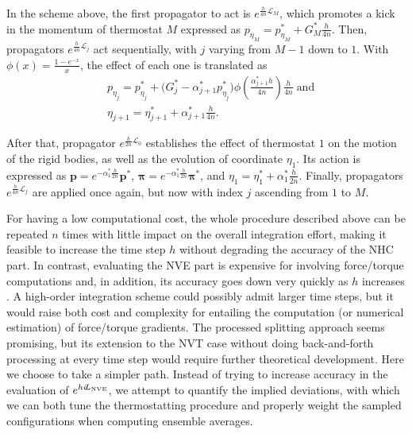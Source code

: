 \documentclass[
journal=jctcce,
layout=twocolumn
]{achemso}
\newcommand{\vt}[1]{\boldsymbol{\mathbf{#1}}}   %
\newcommand{\Liu}[1]{i\!L_\text{#1}}            %
\newcommand{\timestep}{h}
\begin{document}
In the scheme above, the first propagator to act is $e^{\frac{\timestep}{4n} \mathcal{L}_M}$, which promotes a kick in the momentum of thermostat $M$ expressed as $p_{\eta_M} = p_{\eta_M}^\ast + G_M^\ast \frac{\timestep}{4n}$.
Then, propagators $e^{\frac{\timestep}{4n} \mathcal{L}_j}$ act sequentially, with $j$ varying from $M-1$ down to $1$.
With $\phi(x) = \frac{1-e^{-x}}{x}$, the effect of each one is translated as
\begin{align*}
&p_{\eta_j} = p_{\eta_j}^\ast + \Big( G_j^\ast - \alpha_{j+1}^\ast p_{\eta_j}^\ast \Big) \phi\left(\frac{\alpha_{j+1}^\ast \timestep}{4n}\right) \frac{\timestep}{4n} \; \text{and} \\
&\eta_{j+1} = \eta_{j+1}^\ast + \alpha_{j+1}^\ast \frac{\timestep}{4n}.
\end{align*}

After that, propagator $e^{\frac{\timestep}{2n} \mathcal{L}_0}$ establishes the effect of thermostat $1$ on the motion of the rigid bodies, as well as the evolution of coordinate $\eta_1$.
Its action is expressed as ${\vt p} = e^{-\alpha_1^\ast \frac{\timestep}{2n}} {\vt p}^\ast$, ${\vt \pi} = e^{-\alpha_1^\ast \frac{\timestep}{2n}} {\vt \pi}^\ast$, and $\eta_1 = \eta_1^\ast + \alpha_1^\ast \frac{\timestep}{2n}$.
Finally, propagators $e^{\frac{\timestep}{4n} \mathcal{L}_j}$ are applied once again, but now with index $j$ ascending from $1$ to $M$.

For having a low computational cost, the whole procedure described above can be repeated $n$ times with little impact on the overall integration effort, making it feasible to increase the time step $\timestep$ without degrading the accuracy of the NHC part.
In contrast, evaluating the NVE part is expensive for involving force/torque computations and, in addition, its accuracy goes down very quickly as $\timestep$ increases \cite{Davidchack_2010, Silveira_2017}.
A high-order integration scheme\cite{Omelyan_2007, Van_zon_2008} could possibly admit larger time steps, but it would raise both cost and complexity for entailing the computation (or numerical estimation) of force/torque gradients.
The processed splitting approach \cite{Omelyan_2008} seems promising, but its extension to the NVT case without doing back-and-forth processing at every time step would require further theoretical development.
Here we choose to take a simpler path.
Instead of trying to increase accuracy in the evaluation of $e^{\timestep \Liu{\tiny NVE}}$, we attempt to quantify the implied deviations, with which we can both tune the thermostatting procedure and properly weight the sampled configurations when computing ensemble averages.
\end{document}

